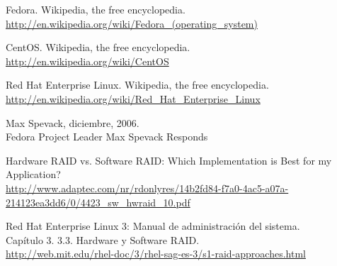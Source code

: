 \documentclass[paper=a4, fontsize=11pt]{scrartcl} %
\numberwithin{equation}{section} %
\numberwithin{figure}{section} %
\numberwithin{table}{section} %
\begin{document}
\begin{thebibliography}{10}
Fedora. Wikipedia, the free encyclopedia.\\
  \url{http://en.wikipedia.org/wiki/Fedora_(operating_system)}

CentOS. Wikipedia, the free encyclopedia.\\
  \url{http://en.wikipedia.org/wiki/CentOS}

Red Hat Enterprise Linux. Wikipedia, the free encyclopedia.\\
  \url{http://en.wikipedia.org/wiki/Red_Hat_Enterprise_Linux}

Max Spevack, diciembre, 2006.\\
  Fedora Project Leader Max Spevack Responds

Hardware RAID vs. Software RAID: Which Implementation is Best for my Application?\\
  \url{http://www.adaptec.com/nr/rdonlyres/14b2fd84-f7a0-4ac5-a07a-214123ea3dd6/0/4423_sw_hwraid_10.pdf}

Red Hat Enterprise Linux 3: Manual de administración del sistema.\\
  Capítulo 3. 3.3. Hardware y Software RAID.\\
  \url{http://web.mit.edu/rhel-doc/3/rhel-sag-es-3/s1-raid-approaches.html}

\end{thebibliography}
\end{document}
